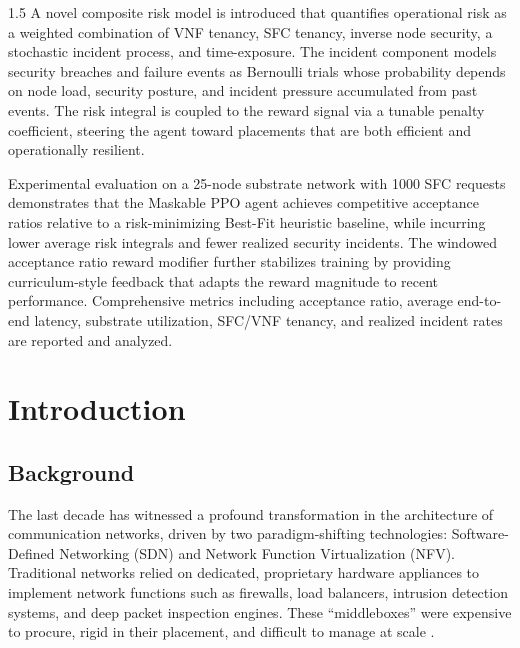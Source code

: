 \documentclass[A4paper,12pt]{report}
\theoremstyle{plain}
\theoremstyle{definition}
\theoremstyle{remark}
\numberwithin{equation}{section}
\begin{document}
\begin{spacing}{1.5}
A novel composite risk model is introduced that quantifies operational risk as a weighted combination of VNF tenancy, SFC tenancy, inverse node security, a stochastic incident process, and time-exposure. The incident component models security breaches and failure events as Bernoulli trials whose probability depends on node load, security posture, and incident pressure accumulated from past events. The risk integral is coupled to the reward signal via a tunable penalty coefficient, steering the agent toward placements that are both efficient and operationally resilient.

Experimental evaluation on a 25-node substrate network with 1000 SFC requests demonstrates that the Maskable PPO agent achieves competitive acceptance ratios relative to a risk-minimizing Best-Fit heuristic baseline, while incurring lower average risk integrals and fewer realized security incidents. The windowed acceptance ratio reward modifier further stabilizes training by providing curriculum-style feedback that adapts the reward magnitude to recent performance. Comprehensive metrics including acceptance ratio, average end-to-end latency, substrate utilization, SFC/VNF tenancy, and realized incident rates are reported and analyzed.

\newpage
\tableofcontents
\clearpage
\listoffigures
\clearpage
{\let\oldnumberline\numberline%
\renewcommand{\numberline}{\tablename~\oldnumberline}%
\listoftables}
\clearpage


\chapter{Introduction}

\section{Background}

The last decade has witnessed a profound transformation in the architecture of communication networks, driven by two paradigm-shifting technologies: Software-Defined Networking (SDN) and Network Function Virtualization (NFV). Traditional networks relied on dedicated, proprietary hardware appliances to implement network functions such as firewalls, load balancers, intrusion detection systems, and deep packet inspection engines. These ``middleboxes'' were expensive to procure, rigid in their placement, and difficult to manage at scale \cite{mijumbi2016}.


\end{spacing}
\end{document}
